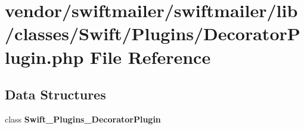 \section{vendor/swiftmailer/swiftmailer/lib/classes/\+Swift/\+Plugins/\+Decorator\+Plugin.php File Reference}
\label{_decorator_plugin_8php}
\subsection*{Data Structures}
\begin{DoxyCompactItemize}
\item 
class {\bf Swift\+\_\+\+Plugins\+\_\+\+Decorator\+Plugin}
\end{DoxyCompactItemize}
